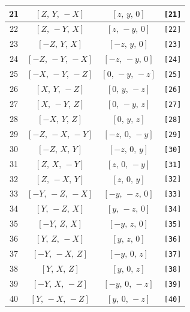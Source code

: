 \documentclass[fleqn,8pt]{jsarticle}
\begin{document}
\begin{longtable}{cccc}
21 & $\left[ Z,\, Y,\, - X \right]$ & $\left[ z,\, y,\, 0 \right]$ & {\tt [21]} \\ \hline
22 & $\left[ Z,\, - Y,\, X \right]$ & $\left[ z,\, - y,\, 0 \right]$ & {\tt [22]} \\ \hline
23 & $\left[ - Z,\, Y,\, X \right]$ & $\left[ - z,\, y,\, 0 \right]$ & {\tt [23]} \\ \hline
24 & $\left[ - Z,\, - Y,\, - X \right]$ & $\left[ - z,\, - y,\, 0 \right]$ & {\tt [24]} \\ \hline
25 & $\left[ - X,\, - Y,\, - Z \right]$ & $\left[ 0,\, - y,\, - z \right]$ & {\tt [25]} \\ \hline
26 & $\left[ X,\, Y,\, - Z \right]$ & $\left[ 0,\, y,\, - z \right]$ & {\tt [26]} \\ \hline
27 & $\left[ X,\, - Y,\, Z \right]$ & $\left[ 0,\, - y,\, z \right]$ & {\tt [27]} \\ \hline
28 & $\left[ - X,\, Y,\, Z \right]$ & $\left[ 0,\, y,\, z \right]$ & {\tt [28]} \\ \hline
29 & $\left[ - Z,\, - X,\, - Y \right]$ & $\left[ - z,\, 0,\, - y \right]$ & {\tt [29]} \\ \hline
30 & $\left[ - Z,\, X,\, Y \right]$ & $\left[ - z,\, 0,\, y \right]$ & {\tt [30]} \\ \hline
31 & $\left[ Z,\, X,\, - Y \right]$ & $\left[ z,\, 0,\, - y \right]$ & {\tt [31]} \\ \hline
32 & $\left[ Z,\, - X,\, Y \right]$ & $\left[ z,\, 0,\, y \right]$ & {\tt [32]} \\ \hline
33 & $\left[ - Y,\, - Z,\, - X \right]$ & $\left[ - y,\, - z,\, 0 \right]$ & {\tt [33]} \\ \hline
34 & $\left[ Y,\, - Z,\, X \right]$ & $\left[ y,\, - z,\, 0 \right]$ & {\tt [34]} \\ \hline
35 & $\left[ - Y,\, Z,\, X \right]$ & $\left[ - y,\, z,\, 0 \right]$ & {\tt [35]} \\ \hline
36 & $\left[ Y,\, Z,\, - X \right]$ & $\left[ y,\, z,\, 0 \right]$ & {\tt [36]} \\ \hline
37 & $\left[ - Y,\, - X,\, Z \right]$ & $\left[ - y,\, 0,\, z \right]$ & {\tt [37]} \\ \hline
38 & $\left[ Y,\, X,\, Z \right]$ & $\left[ y,\, 0,\, z \right]$ & {\tt [38]} \\ \hline
39 & $\left[ - Y,\, X,\, - Z \right]$ & $\left[ - y,\, 0,\, - z \right]$ & {\tt [39]} \\ \hline
40 & $\left[ Y,\, - X,\, - Z \right]$ & $\left[ y,\, 0,\, - z \right]$ & {\tt [40]} \\ \hline

\end{longtable}
\end{document}
